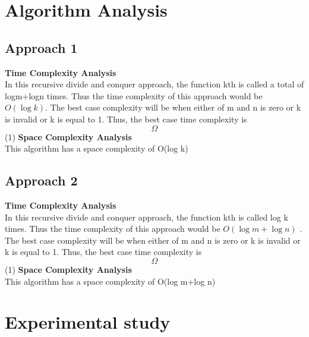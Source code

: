 \documentclass[conference]{IEEEtran}
\begin{document}
\section{Algorithm Analysis}

\subsection{\textbf{Approach 1}} 
\textbf{Time Complexity Analysis}
\\In this recursive divide and conquer approach, the function kth is called a total of logm+logn  times. Thus the time complexity of this approach would be $\displaystyle{O}{\left( \log{{k}}\right)}$. The best case complexity will be when either of m and n is zero or k is invalid or k is equal to 1. Thus, the best case time
complexity is  \displaystyle\[\Omega\](1)
\newline
\textbf{Space Complexity Analysis}
\\This algorithm has a space complexity of O(log k)

\subsection{\textbf{Approach 2}} 
\textbf{Time Complexity Analysis}
\\In this recursive divide and conquer approach, the function kth is called log k times. Thus the time complexity of this approach would be $\displaystyle{O}{\left( \log{{m}}+ \log{{n}}\right)}$ . \newline The best case complexity will be when either of m and n is zero or k is invalid or k is equal to 1. Thus, the best case time
complexity is  \displaystyle\[\Omega\](1)
\newline
\textbf{Space Complexity Analysis}
\\This algorithm has a space complexity of O(log m+log n)

\section{Experimental study}

\end{document}
